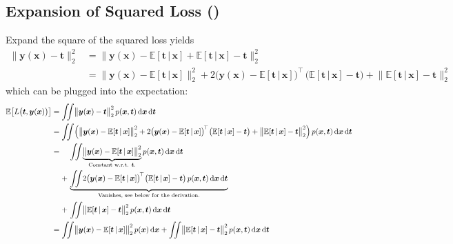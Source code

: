 \documentclass[11pt, a4paper]{scrartcl}
\newcommand{\E}{\mathbb{E}}
\newcommand{\transposed}{{\!\top\!}}
\renewcommand{\vec}[1]{\bm{#1}}
\newcommand{\given}{\,\vert\,}
\newcommand{\diffstar}{\texorpdfstring{\raisebox{-1pt}{\resizebox{!}{8pt}{\(\star\)}}}{*}}
\newcommand{\onestar}  {(\diffstar)}
\begin{document}
		\subsection{Expansion of Squared Loss  \onestar}
			Expand the square of the squared loss yields
			\begin{align}
				\big\lVert \vec{y}(\vec{x}) - \vec{t} \big\rVert_2^2
					&= \big\lVert \vec{y}(\vec{x}) - \E[\vec{t} \given \vec{x}] + \E[\vec{t} \given \vec{x}] - \vec{t} \big\rVert_2^2 \\
					&= \big\lVert \vec{y}(\vec{x}) - \E[\vec{t} \given \vec{x}] \big\rVert_2^2
						+ 2 \big( \vec{y}(\vec{x}) - \E[\vec{t} \given \vec{x}] \big)^\transposed \, \big( \E[\vec{t} \given \vec{x}] - \vec{t} \big)
						+ \big\lVert \E[\vec{t} \given \vec{x}] - \vec{t} \big\rVert_2^2
			\end{align}
			which can be plugged into the expectation:
			\begin{align}
				\E\big[ L\big( \vec{t}, \vec{y}(\vec{x}) \big) \big]
					&= \iint\! \big\lVert \vec{y}(\vec{x}) - \vec{t} \big\rVert_2^2 \, p(\vec{x}, \vec{t}) \dd{\vec{x}} \dd{\vec{t}} \\
					&= \iint\! \Big(
							  \big\lVert \vec{y}(\vec{x}) - \E[\vec{t} \given \vec{x}] \big\rVert_2^2
							+ 2 \big( \vec{y}(\vec{x}) - \E[\vec{t} \given \vec{x}] \big)^\transposed \, \big( \E[\vec{t} \given \vec{x}] - \vec{t} \big)
							+ \big\lVert \E[\vec{t} \given \vec{x}] - \vec{t} \big\rVert_2^2
					\Big) \, p(\vec{x}, \vec{t}) \dd{\vec{x}} \dd{\vec{t}} \\
					&=
						\begin{aligned}[t]
							 &\, \iint\! \underbrace{\big\lVert \vec{y}(\vec{x}) - \E[\vec{t} \given \vec{x}] \big\rVert_2^2}_{\mathclap{\text{Constant w.r.t. \(\vec{t}\).}}} p(\vec{x}, \vec{t}) \dd{\vec{x}} \dd{\vec{t}} \\
							+&\, \underbrace{\iint\! 2 \big( \vec{y}(\vec{x}) - \E[\vec{t} \given \vec{x}] \big)^\transposed \, \big( \E[\vec{t} \given \vec{x}] - \vec{t} \big) \, p(\vec{x}, \vec{t}) \dd{\vec{x}} \dd{\vec{t}}}_{\mathclap{\text{Vanishes, see below for the derivation.}}} \\
							+&\, \iint\! \big\lVert \E[\vec{t} \given \vec{x}] - \vec{t} \big\rVert_2^2 \, p(\vec{x}, \vec{t}) \dd{\vec{x}} \dd{\vec{t}}
						\end{aligned} \\
					&= \iint\! \big\lVert \vec{y}(\vec{x}) - \E[\vec{t} \given \vec{x}] \big\rVert_2^2 \, p(\vec{x}) \dd{\vec{x}} + \iint\! \big\lVert \E[\vec{t} \given \vec{x}] - \vec{t} \big\rVert_2^2 \, p(\vec{x}, \vec{t}) \dd{\vec{x}} \dd{\vec{t}}
			\end{align}
\end{document}
